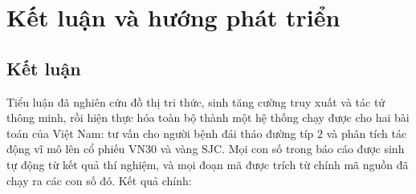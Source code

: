 \chapter{Kết luận và hướng phát triển}\label{chap:ketluan}

\section{Kết luận}
Tiểu luận đã nghiên cứu đồ thị tri thức, sinh tăng cường truy xuất và tác tử thông minh, rồi hiện thực hóa toàn bộ
thành một hệ thống chạy được cho hai bài toán của Việt Nam: tư vấn cho người bệnh đái tháo đường típ 2 và phân tích
tác động vĩ mô lên cổ phiếu VN30 và vàng SJC. Mọi con số trong báo cáo được sinh tự động từ kết quả thí nghiệm, và mọi
đoạn mã được trích từ chính mã nguồn đã chạy ra các con số đó. Kết quả chính:

